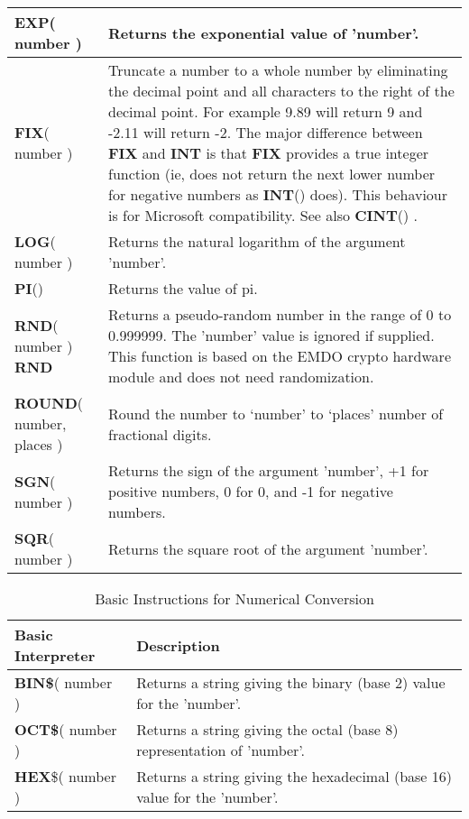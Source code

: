 \begin{table}[]
\begin{tabular}{|p{4cm}|p{10cm}|}
\\ \hline
\textbf{EXP}( number ) & Returns the exponential value of 'number'.
\\ \hline
\textbf{FIX}( number ) & Truncate a number to a whole number by eliminating the decimal point
and all characters to the right of the decimal point.\newline
For example 9.89 will return 9 and -2.11 will return -2.\newline
The major difference between \textbf{FIX} and \textbf{INT} is that \textbf{FIX} provides a true
integer function (ie, does not return the next lower number for negative
numbers as \textbf{INT}() does). This behaviour is for Microsoft compatibility.
See also \textbf{CINT}() .
\\ \hline
\textbf{LOG}( number ) & Returns the natural logarithm of the argument 'number'. 
\\ \hline
\textbf{PI}() & Returns the value of pi.
\\ \hline
\textbf{RND}( number )\newline
\textbf{RND}
& Returns a pseudo-random number in the range of 0 to 0.999999. The
'number' value is ignored if supplied. This function is based on the EMDO crypto hardware module and does not need randomization.
\\ \hline
\textbf{ROUND}( number, places )
& Round the number to ‘number’ to ‘places’ number of fractional digits.
\\ \hline
\textbf{SGN}( number ) & Returns the sign of the argument 'number', +1 for positive numbers, 0 for
0, and -1 for negative numbers.
\\ \hline
\textbf{SQR}( number ) & Returns the square root of the argument 'number'.
\\ \hline
\end{tabular}
\end{table}

\begin{table}[]
\centering
\caption{Basic Instructions for Numerical Conversion}
\label{Basic_Instructions_for_Numerical_Conversion}
\begin{tabular}{|p{4cm}|p{10cm}|}
\hline
\textbf{Basic Interpreter} & \textbf{Description}                                                             \\ \hline
\textbf{BIN\$}( number ) 
& Returns a string giving the binary (base 2) value for the 'number'.
\\ \hline
\textbf{OCT\$}( number ) & Returns a string giving the octal (base 8) representation of 'number'.
\\ \hline
\textbf{HEX}\$( number ) & Returns a string giving the hexadecimal (base 16) value for the 'number'.
\\ \hline
\end{tabular}
\end{table}
